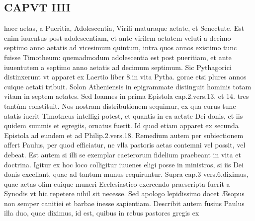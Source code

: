 \documentclass{article}
\begin{document}
\begin{pages}
\section*{CAPVT  IIII }
\marginpar{[ p.229 ]}\pstart haec aetas, a Pueritia, Adolescentia, Virili maturaque aetate, et Senectute. Est enim iuuentus post adolescentiam, et ante virilem aetatem veluti a decimo septimo anno aetatis ad vicesimum quintum, intra quos annos existimo tunc fuisse Timotheum: quemadmodum adolescentia est post pueritiam, et ante iuuentutem a septimo anno aetatis ad decimum septimum. Sic Pythagorici distinxerunt vt apparet ex Laertio liber 8.in vita Pytha. gorae etsi plures annos cuique aetati tribuit. Solon Atheniensis in epigrammate distinguit hominis totam vitam in septem aetates. Sed Ioannes in prima Epistola cap.2.vers.13. et 14. tres tantùm constituit. Nos nostram distributionem sequimur, ex qua curus tunc atatis iuerit Timotneus intelligi potest, et quantis in ea aetate Dei donis, et iis quidem summis et egregiis, ornatus fuerit. Id quod etiam apparet ex secunda Epistola ad eundem et ad Philip.2.vers.18.  \pend\pstart Remedium autem per subiectionem affert Paulus, per quod efficiatur, ne vlla pastoris aetas contemni vel possit, vel debeat. Est autem si illi se exemplar caeterorum fidelium praebeant in vita et doctrina. Igitur ex hoc loco colligitur iuuenes eligi posse in ministros, si iis Dei donis excellant, quae ad tantum munus requiruntur. Supra cap.3 vers.6.diximus, quae aetas olim cuique muneri Ecclesiastico exercendo praescripta fuerit a Synodis vt hic repetere nihil sit necesse. Sed apologo lepidissimo docet Æsopus non semper canitiei et barbae inesse sapientiam.  \pend\pstart Describit autem fusius Paulus illa duo, quae diximus, id est, quibus in rebus pastores gregis ex  \pend

\end{pages}
\end{document}
